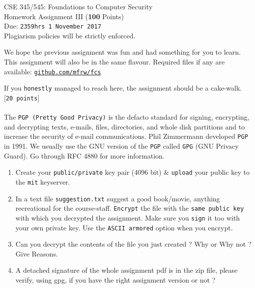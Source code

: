 \documentclass[11pt]{article}
\begin{document}
\begin{center}
\LARGE CSE 345/545: Foundations to Computer Security \\
\Large Homework Assignment III (\textbf{100} Points) \\
\Large Due: \texttt{2359hrs 1 November 2017} \\
Plagiarism policies will be strictly enforced. \\
\end{center}

\noindent We hope the previous assignment was fun and had something for you to learn. This assignment will also be in the same flavour.
Required files if any are available: \href{https://www.github.com/mfrw/fcs/}{\texttt{github.com/mfrw/fcs\\}}

\noindent If you \texttt{honestly} managed to reach here, the assignment should be a cake-walk.\\



 [\texttt{20 points}] \\\\
The \texttt{PGP (Pretty Good Privacy)} is the defacto standard for signing, encrypting, and decrypting texts, e-mails, files, directories, and whole disk partitions and to increase the security of e-mail communications. Phil Zimmermann developed \texttt{PGP} in 1991. We usually use the GNU version of the \texttt{PGP} called \texttt{GPG} (GNU Privacy Guard).
Go through RFC 4880 for more information.
\begin{enumerate}
	\item Create your \texttt{public/private} key pair (4096 bit) \& \texttt{upload} your public key to the \texttt{mit} keyserver.
	\item In a text file \texttt{suggestion.txt} suggest a good book/movie, anything recreational for the course-staff. \texttt{Encrypt} the file with the \texttt{same public key} with which you decrypted the
		assignment. Make sure you \texttt{sign} it too with your own private key. Use the \texttt{ASCII armored} option when you encrypt.
	\item Can you decrypt the contents of the file you just created ? Why or Why not ? Give Reasons.
	\item A detached signature of the whole assignment pdf is in the zip file, please verify, using gpg, if you have the right assignment version or not ?
\end{enumerate}
\end{document}
